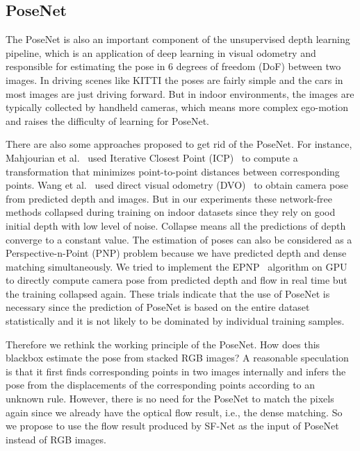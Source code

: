 \documentclass[10pt,twocolumn,letterpaper]{article}
\begin{document}
\subsection{PoseNet}

The PoseNet is also an important component of the unsupervised depth learning pipeline, which is an application of deep learning in visual odometry and responsible for estimating the pose in 6 degrees of freedom (DoF) between two images. In driving scenes like KITTI the poses are fairly simple and the cars in most images are just driving forward. But in indoor environments, the images are typically collected by handheld cameras, which means more complex ego-motion and raises the difficulty of learning for PoseNet.

There are also some approaches proposed to get rid of the PoseNet. For instance, Mahjourian et al.~\cite{mahjourian2018unsupervised} used Iterative Closest Point (ICP)~\cite{besl1992method,chen1992object,rusinkiewicz2001efficient} to compute a transformation that minimizes point-to-point distances between corresponding points. Wang et al.~\cite{wang2018learning} used direct visual odometry (DVO)~\cite{steinbrucker2011real} to obtain camera pose from predicted depth and images. But in our experiments these network-free methods collapsed during training on indoor datasets since they rely on good initial depth with low level of noise. Collapse means all the predictions of depth converge to a constant value. The estimation of poses can also be considered as a Perspective-n-Point (PNP) problem because we have predicted depth and dense matching simultaneously. We tried to implement the EPNP~\cite{lepetit2009epnp} algorithm on GPU to directly compute camera pose from predicted depth and flow in real time but the training collapsed again. These trials indicate that the use of PoseNet is necessary since the prediction of PoseNet is based on the entire dataset statistically and it is not likely to be dominated by individual training samples.

Therefore we rethink the working principle of the PoseNet. How does this blackbox estimate the pose from stacked RGB images? A reasonable speculation is that it first finds corresponding points in two images internally and infers the pose from the displacements of the corresponding points according to an unknown rule. However, there is no need for the PoseNet to match the pixels again since we already have the optical flow result, i.e., the dense matching. So we propose to use the flow result produced by SF-Net as the input of PoseNet instead of RGB images. 
\end{document}

